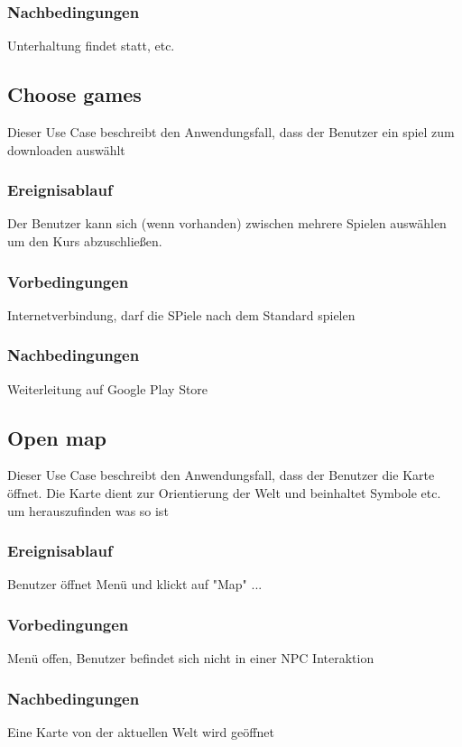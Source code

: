 		\subsubsection{Nachbedingungen}
			Unterhaltung findet statt, etc.
	
	\subsection{Choose games}
		Dieser Use Case beschreibt den Anwendungsfall, dass der Benutzer ein spiel zum downloaden auswählt
			
		\subsubsection{Ereignisablauf}
			Der Benutzer kann sich (wenn vorhanden) zwischen mehrere Spielen auswählen um den Kurs abzuschließen.

		\subsubsection{Vorbedingungen}
			Internetverbindung, darf die SPiele nach dem Standard spielen
			
		\subsubsection{Nachbedingungen}
			Weiterleitung auf Google Play Store

	\subsection{Open map}
		Dieser Use Case beschreibt den Anwendungsfall, dass der Benutzer die Karte öffnet. Die Karte dient zur Orientierung der Welt und beinhaltet Symbole etc. um herauszufinden was so ist
			
		\subsubsection{Ereignisablauf}
			Benutzer öffnet Menü und klickt auf "Map" ...
	
		\subsubsection{Vorbedingungen}
			Menü offen, Benutzer befindet sich nicht in einer NPC Interaktion
			
		\subsubsection{Nachbedingungen}
			Eine Karte von der aktuellen Welt wird geöffnet
	
